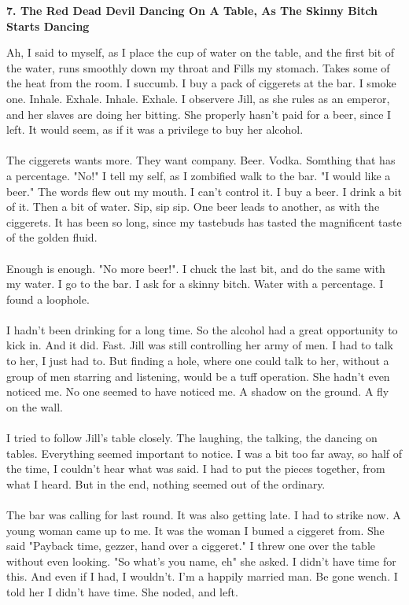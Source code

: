 \documentclass[]{article}
\begin{document}
\newpage

\begin{center}
\large\textbf{7. The Red Dead Devil Dancing On A Table, \newline As The Skinny Bitch Starts Dancing}
\end{center}

Ah, I said to myself, as I place the cup of water on the table, and the first bit of the water, runs smoothly down my throat and Fills my stomach. Takes some of the heat from the room. I succumb. I buy a pack of ciggerets at the bar. I smoke one. Inhale. Exhale. Inhale. Exhale. I observere Jill, as she rules as an emperor, and her slaves are doing her bitting. She properly hasn't paid for a beer, since I left. It would seem, as if it was a privilege to buy her alcohol.
\\ \\
The ciggerets wants more. They want company. Beer. Vodka. Somthing that has a percentage. "No!" I tell my self, as I zombified walk to the bar. "I would like a beer." The words flew out my mouth. I can't control it. I buy a beer. I drink a bit of it. Then a bit of water. Sip, sip sip. One beer leads to another, as with the ciggerets. It has been so long, since my tastebuds has tasted the magnificent taste of the golden fluid. 
\\ \\
Enough is enough. "No more beer!". I chuck the last bit, and do the same with my water. I go to the bar. I ask for a skinny bitch. Water with a percentage. I found a loophole.
\\ \\
I hadn't been drinking for a long time. So the alcohol had a great opportunity to kick in. And it did. Fast. Jill was still controlling her army of men. I had to talk to her, I just had to. But finding a hole, where one could talk to her, without a group of men starring and listening, would be a tuff operation. She hadn't even noticed me. No one seemed to have noticed me. A shadow on the ground. A fly on the wall.
\\ \\
I tried to follow Jill's table closely. The laughing, the talking, the dancing on tables. Everything seemed important to notice. I was a bit too far away, so half of the time, I couldn't hear what was said. I had to put the pieces together, from what I heard. But in the end, nothing seemed out of the ordinary.
\\ \\
The bar was calling for last round. It was also getting late. I had to strike now. A young woman came up to me. It was the woman I bumed a ciggeret from. She said "Payback time, gezzer, hand over a ciggeret." I threw one over the table without even looking. "So what's you name, eh" she asked. I didn't have time for this. And even if I had, I wouldn't. I'm a happily married man. Be gone wench. I told her I didn't have time. She noded, and left.
\end{document}
